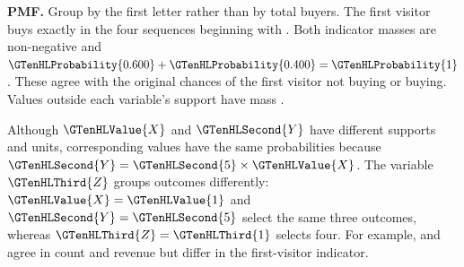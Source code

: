 \textbf{ PMF.} Group by the first letter rather than by total buyers. The first visitor buys exactly in the four sequences beginning with .
Both indicator masses are non-negative and $\GTenHLProbability{0.600}+\GTenHLProbability{0.400}=\GTenHLProbability{1}$. These agree with the original chances of the first visitor not buying or buying. Values outside each variable's support have mass .

Although $\GTenHLValue{X}$ and $\GTenHLSecond{Y}$ have different supports and units, corresponding values have the same probabilities because $\GTenHLSecond{Y}=\GTenHLSecond{5}\times\GTenHLValue{X}$. The variable $\GTenHLThird{Z}$ groups outcomes differently: $\GTenHLValue{X}=\GTenHLValue{1}$ and $\GTenHLSecond{Y}=\GTenHLSecond{5}$ select the same three outcomes, whereas $\GTenHLThird{Z}=\GTenHLThird{1}$ selects four. For example,  and  agree in count and revenue but differ in the first-visitor indicator.



